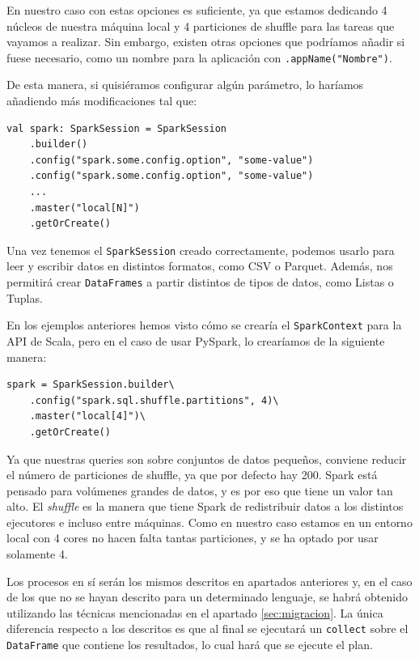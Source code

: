 \documentclass[12pt,twoside,titlepage]{report}
\begin{document}
En nuestro caso con estas opciones es suficiente, ya que estamos dedicando 4 núcleos de nuestra máquina local y 4 particiones de shuffle para las tareas que vayamos a realizar. Sin embargo, existen otras opciones que podríamos añadir si fuese necesario, como un nombre para la aplicación con \texttt{.appName("Nombre")}. 

De esta manera, si quisiéramos configurar algún parámetro, lo haríamos añadiendo más modificaciones tal que: 

\begin{lstlisting}
val spark: SparkSession = SparkSession
	.builder()
	.config("spark.some.config.option", "some-value")
	.config("spark.some.config.option", "some-value")
	...
	.master("local[N]")
	.getOrCreate()
\end{lstlisting}

Una vez tenemos el \texttt{SparkSession} creado correctamente, podemos usarlo para leer y escribir datos en distintos formatos, como CSV o Parquet. Además, nos permitirá crear \texttt{DataFrames} a partir distintos de tipos de datos, como Listas o Tuplas.

En los ejemplos anteriores hemos visto cómo se crearía el \texttt{SparkContext} para la API de Scala, pero en el caso de usar PySpark, lo crearíamos de la siguiente manera:

\begin{lstlisting}
spark = SparkSession.builder\
	.config("spark.sql.shuffle.partitions", 4)\
	.master("local[4]")\
	.getOrCreate()
\end{lstlisting}

Ya que nuestras queries son sobre conjuntos de datos pequeños, conviene reducir el número de particiones de shuffle, ya que por defecto hay 200. Spark está pensado para volúmenes grandes de datos, y es por eso que tiene un valor tan alto. El \textit{shuffle} es la manera que tiene Spark de redistribuir datos a los distintos ejecutores e incluso entre máquinas. Como en nuestro caso estamos en un entorno local con 4 cores no hacen falta tantas particiones, y se ha optado por usar solamente 4.

Los procesos en sí serán los mismos descritos en apartados anteriores y, en el caso de los que no se hayan descrito para un determinado lenguaje, se habrá obtenido utilizando las técnicas mencionadas en el apartado \ref{sec:migracion}. La única diferencia respecto a los descritos es que al final se ejecutará un \texttt{collect} sobre el \texttt{DataFrame} que contiene los resultados, lo cual hará que se ejecute el plan.
\end{document}
